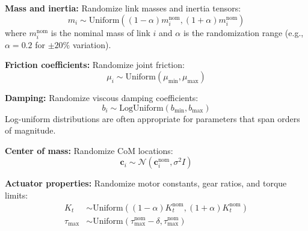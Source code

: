 \textbf{Mass and inertia:} Randomize link masses and inertia tensors:
\begin{equation}
m_i \sim \text{Uniform}((1-\alpha)m_i^{\text{nom}}, (1+\alpha)m_i^{\text{nom}})
\end{equation}
where $m_i^{\text{nom}}$ is the nominal mass of link $i$ and $\alpha$ is the randomization range (e.g., $\alpha = 0.2$ for $\pm 20\%$ variation).

\textbf{Friction coefficients:} Randomize joint friction:
\begin{equation}
\mu_i \sim \text{Uniform}(\mu_{\min}, \mu_{\max})
\end{equation}

\textbf{Damping:} Randomize viscous damping coefficients:
\begin{equation}
b_i \sim \text{LogUniform}(b_{\min}, b_{\max})
\end{equation}
Log-uniform distributions are often appropriate for parameters that span orders of magnitude.

\textbf{Center of mass:} Randomize CoM locations:
\begin{equation}
\mathbf{c}_i \sim \mathcal{N}(\mathbf{c}_i^{\text{nom}}, \sigma^2 I)
\end{equation}

\textbf{Actuator properties:} Randomize motor constants, gear ratios, and torque limits:
\begin{align}
K_t &\sim \text{Uniform}((1-\alpha)K_t^{\text{nom}}, (1+\alpha)K_t^{\text{nom}}) \\
\tau_{\max} &\sim \text{Uniform}(\tau_{\max}^{\text{nom}} - \delta, \tau_{\max}^{\text{nom}})
\end{align}

